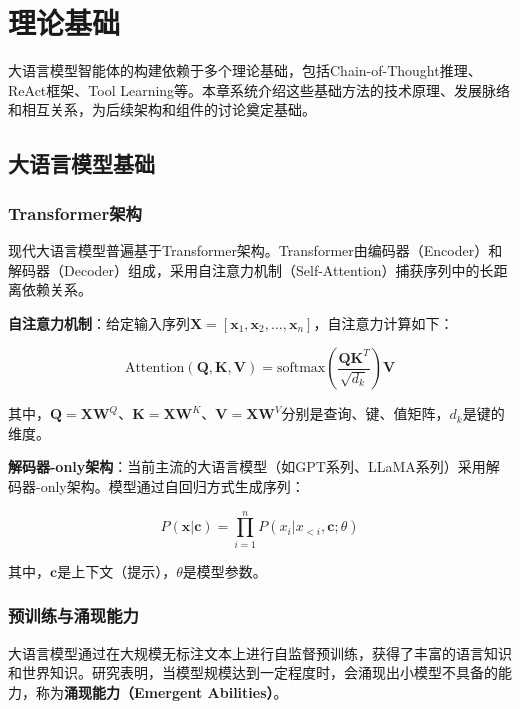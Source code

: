 \section{理论基础}\label{sec:foundation}

大语言模型智能体的构建依赖于多个理论基础，包括Chain-of-Thought推理、ReAct框架、Tool Learning等。本章系统介绍这些基础方法的技术原理、发展脉络和相互关系，为后续架构和组件的讨论奠定基础。

\subsection{大语言模型基础}

\subsubsection{Transformer架构}

现代大语言模型普遍基于Transformer架构。Transformer由编码器（Encoder）和解码器（Decoder）组成，采用自注意力机制（Self-Attention）捕获序列中的长距离依赖关系。

\textbf{自注意力机制}：给定输入序列$\mathbf{X} = [\mathbf{x}_1, \mathbf{x}_2, \ldots, \mathbf{x}_n]$，自注意力计算如下：

\begin{equation}\label{eq:self_attention}
    \text{Attention}(\mathbf{Q}, \mathbf{K}, \mathbf{V}) = \text{softmax}\left(\frac{\mathbf{Q}\mathbf{K}^T}{\sqrt{d_k}}\right)\mathbf{V}
\end{equation}

其中，$\mathbf{Q} = \mathbf{X}\mathbf{W}^Q$、$\mathbf{K} = \mathbf{X}\mathbf{W}^K$、$\mathbf{V} = \mathbf{X}\mathbf{W}^V$分别是查询、键、值矩阵，$d_k$是键的维度。

\textbf{解码器-only架构}：当前主流的大语言模型（如GPT系列、LLaMA系列）采用解码器-only架构。模型通过自回归方式生成序列：

\begin{equation}\label{eq:autoregressive}
    P(\mathbf{x} | \mathbf{c}) = \prod_{i=1}^{n} P(x_i | x_{<i}, \mathbf{c}; \theta)
\end{equation}

其中，$\mathbf{c}$是上下文（提示），$\theta$是模型参数。

\subsubsection{预训练与涌现能力}

大语言模型通过在大规模无标注文本上进行自监督预训练，获得了丰富的语言知识和世界知识。研究表明，当模型规模达到一定程度时，会涌现出小模型不具备的能力，称为\textbf{涌现能力（Emergent Abilities）}。

